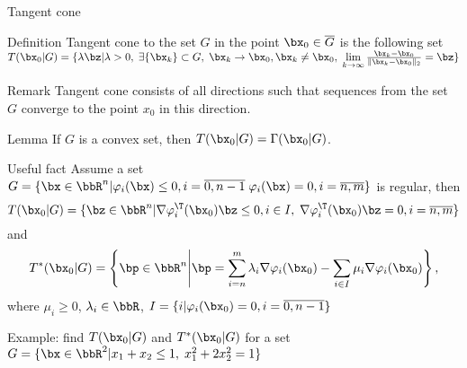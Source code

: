 \documentclass[12pt]{beamer}
\begin{document}
\begin{frame}{Tangent cone}
\begin{block}{Definition}
Tangent cone to the set $G$ in the point $\bx_0 \in \overline{G}$ is the following set $T(\bx_0 |G) = \{ \lambda \bz | \lambda > 0, \; \exists \{\bx_k\} \subset G, \; \bx_k \rightarrow \bx_0, \bx_k \neq \bx_0, \; \lim\limits_{k \rightarrow \infty} \frac{\bx_k - \bx_0}{\|\bx_k - \bx_0\|_2} = \bz \}$
\end{block}

\begin{block}{Remark}
Tangent cone consists of all directions such that sequences from the set $G$ converge to the point $x_0$ in this direction.
\end{block}

\begin{block}{Lemma}
If $G$ is a convex set, then $T(\bx_0|G) = \Gamma(\bx_0|G)$.
\end{block}
\end{frame}

\begin{frame}{Useful fact}
Assume a set $G = \{\bx \in \bbR^n | \varphi_i(\bx) \leq 0, i = \overline{0, n-1} \; \varphi_i(\bx) = 0, i = \overline{n, m} \}$ is regular, then 
\vspace{-4mm}
\[
T(\bx_0|G) = \{ \bz \in \bbR^n | \nabla \varphi^{\T}_i(\bx_0)\bz \leq 0, i \in I, \; \nabla \varphi^{\T}_i(\bx_0)\bz = 0, i = \overline{n,m} \}
\vspace{-4mm}
\]
and \vspace{-4mm}
\[
T^*(\bx_0|G) = \left \{ \bp \in \bbR^n \middle| \bp = \sum\limits_{i = n}^m \lambda_i \nabla \varphi_i(\bx_0) - \sum\limits_{i \in I} \mu_i \nabla \varphi_i(\bx_0) \right \},
\] 
where $\mu_i \geq 0$, $\lambda_i \in \bbR$, $I = \{i | \varphi_i(\bx_0) = 0, i = \overline{0, n-1} \}$

Example: find $T(\bx_0|G)$ and $T^*(\bx_0|G)$ for a set $G = \{\bx \in \bbR^2 | x_1 + x_2 \leq 1, \; x^2_1 + 2x_2^2 = 1 \}$
\end{frame}
\end{document}
